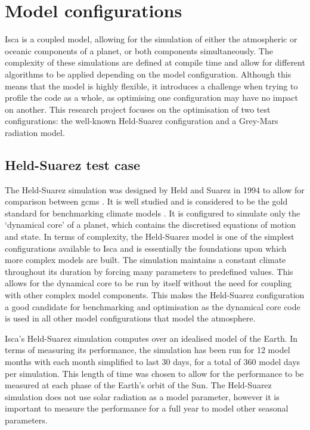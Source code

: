 \documentclass[a4paper,11pt]{report}
\begin{document}
\section{Model configurations}
Isca is a coupled model, allowing for the simulation of either the atmospheric or oceanic components of a planet, or both components simultaneously. The complexity of these simulations are defined at compile time and allow for different algorithms to be applied depending on the model configuration. Although this means that the model is highly flexible, it introduces a challenge when trying to profile the code as a whole, as optimising one configuration may have no impact on another. This research project focuses on the optimisation of two test configurations: the well-known Held-Suarez configuration and a Grey-Mars radiation model.

\subsection{Held-Suarez test case}
The Held-Suarez simulation was designed by Held and Suarez in 1994 to allow for comparison between \gls{gcm}s \cite{held1994proposal}. It is well studied and is considered to be the gold standard for benchmarking climate models \cite{wan2008ensemble, duben2014benchmark, taylor1998performance}. It is configured to simulate only the `dynamical core' of a planet, which contains the discretised equations of motion and state. In terms of complexity, the Held-Suarez model is one of the simplest configurations available to Isca and is essentially the foundations upon which more complex models are built. The simulation maintains a constant climate throughout its duration by forcing many parameters to predefined values. This allows for the dynamical core to be run by itself without the need for coupling with other complex model components. This makes the Held-Suarez configuration a good candidate for benchmarking and optimisation as the dynamical core code is used in all other model configurations that model the atmosphere. 
\par
Isca's Held-Suarez simulation computes over an idealised model of the Earth. In terms of measuring its performance, the simulation has been run for 12 model months with each month simplified to last 30 days, for a total of 360 model days per simulation. This length of time was chosen to allow for the performance to be measured at each phase of the Earth's orbit of the Sun. The Held-Suarez simulation does not use solar radiation as a model parameter, however it is important to measure the performance for a full year to model other seasonal parameters.
\end{document}
